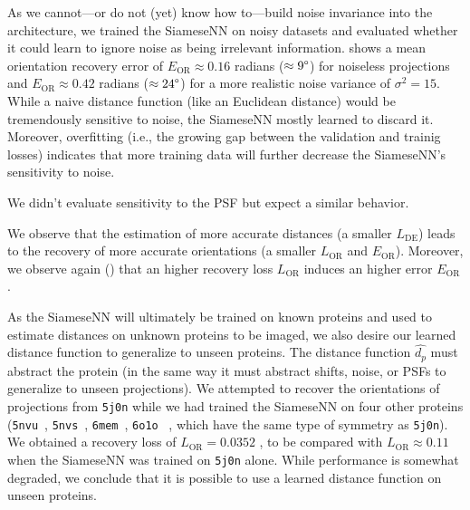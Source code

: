 As we cannot---or do not (yet) know how to---build noise invariance into the architecture, we trained the SiameseNN on noisy datasets and evaluated whether it could learn to ignore noise as being irrelevant information.
 shows a mean orientation recovery error of $E_\text{OR} \approx 0.16$ radians ($\approx 9\degree$) for noiseless projections and $E_\text{OR} \approx 0.42$ radians ($\approx 24\degree$) for a more realistic noise variance of $\sigma^2=15$.
While a naive distance function (like an Euclidean distance) would be tremendously sensitive to noise, the SiameseNN mostly learned to discard it.
Moreover, overfitting (i.e., the growing gap between the validation and trainig losses) indicates that more training data will further decrease the SiameseNN's sensitivity to noise.

We didn't evaluate sensitivity to the PSF but expect a similar behavior.

We observe that the estimation of more accurate distances (a smaller $L_\text{DE}$) leads to the recovery of more accurate orientations (a smaller $L_\text{OR}$ and $E_\text{OR}$).
Moreover, we observe again () that an higher recovery loss $L_\text{OR}$ induces an higher error $E_\text{OR}$.


As the SiameseNN will ultimately be trained on known proteins and used to estimate distances on unknown proteins to be imaged,
we also desire our learned distance function to generalize to unseen proteins.
The distance function $\widehat{d_p}$ must abstract the protein (in the same way it must abstract shifts, noise, or PSFs to generalize to unseen projections).
We attempted to recover the orientations of projections from \texttt{5j0n} while we had trained the SiameseNN on four other proteins (\texttt{5nvu}~\cite{5nvu_pdb}, \texttt{5nvs}~\cite{5nvs_pdb}, \texttt{6mem}~\cite{6mem_pdb}, \texttt{6o1o}~\cite{6o1o_pdb} , which have the same type of symmetry as \texttt{5j0n}).
We obtained a recovery loss of $L_\text{OR} = 0.0352$ ,
to be compared with $L_\text{OR} \approx 0.11$ when the SiameseNN was trained on \texttt{5j0n} alone.
While performance is somewhat degraded, we conclude that it is possible to use a learned distance function on unseen proteins.

